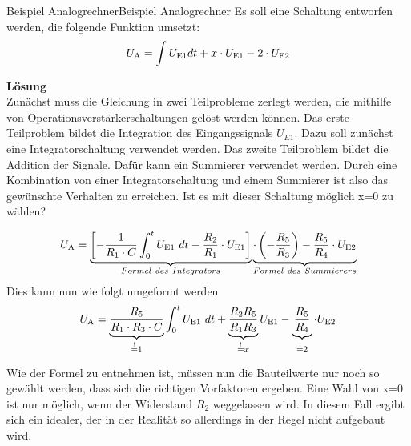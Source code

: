\begin{frame}
{    \begin{bsp}{Beispiel Analogrechner}{Beispiel Analogrechner}
        Es soll eine Schaltung entworfen werden, die folgende Funktion umsetzt:
        \begin{equation}
            U_{\textnormal{A}} = \int U_{\textnormal{E1}} dt +x \cdot U_{\textnormal{E1}} - 2\cdot U_{\textnormal{E2}} 
        \end{equation}
        
        \textbf{Lösung}\\
        Zunächst muss die Gleichung in zwei Teilprobleme zerlegt werden, die mithilfe von Operationsverstärkerschaltungen gelöst werden können.
        Das erste Teilproblem bildet die Integration des Eingangssignals $U_{E1}$. Dazu soll zunächst eine Integratorschaltung verwendet werden.
        Das zweite Teilproblem bildet die Addition der Signale. Dafür kann ein Summierer verwendet werden.
        Durch eine Kombination von einer Integratorschaltung und einem Summierer ist also das gewünschte Verhalten zu erreichen. Ist es mit dieser Schaltung möglich x=0 zu wählen?
        

        \begin{equation}
            U_{\textnormal{A}} = \underbrace{\left[ -\frac{1}{R_1 \cdot C} \int_{0}^{t} U_{\textnormal{E1}}~dt -\frac{R_2}{R_1} \cdot U_{\textnormal{E1}} \right]}_{Formel~des~Integrators} \underbrace{\cdot\left(-\frac{R_5}{R_3}\right)-\frac{R_5}{R_4}\cdot U_{\textnormal{E2}}}_{Formel~des~Summierers} 
        \end{equation}
        Dies kann nun wie folgt umgeformt werden
        \begin{equation}
            U_{\textnormal{A}} = \underbrace{\frac{R_5}{R_1 \cdot R_3 \cdot C}}_{\stackrel{!}{=}1} \int_{0}^{t} U_{\textnormal{E1}}~dt + \underbrace{\frac{R_2 R_5}{R_1 R_3}}_{\stackrel{!}{=}x} U_{\textnormal{E1}} -\underbrace{\frac{R_5}{R_4}}_{\stackrel{!}{=}2} \cdot U_{\textnormal{E2}} 
        \end{equation}

        Wie der Formel zu entnehmen ist, müssen nun die Bauteilwerte nur noch so gewählt werden, dass sich die richtigen Vorfaktoren ergeben.
        Eine Wahl von x=0 ist nur möglich, wenn der Widerstand $R_2$ weggelassen wird. In diesem Fall ergibt sich ein \glqq idealer\grqq{}, der in der Realität so allerdings in der Regel nicht aufgebaut wird. 


\end{bsp}}
\end{frame}

